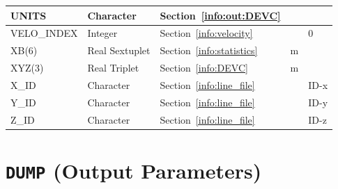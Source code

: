 \documentclass[11pt]{book}
\begin{document}
\begin{longtable}{@{\extracolsep{\fill}}|l|l|l|l|l|}
{\ct UNITS}                 & Character       & Section~\ref{info:out:DEVC}                                     &       &               \\ \hline
{\ct VELO\_INDEX}           & Integer         & Section~\ref{info:velocity}                                     &       &  0            \\ \hline
{\ct XB(6)}                 & Real Sextuplet  & Section~\ref{info:statistics}                                   & m     &               \\ \hline
{\ct XYZ(3)}                & Real Triplet    & Section~\ref{info:DEVC}                                         & m     &               \\ \hline
{\ct X\_ID}                 & Character       & Section~\ref{info:line_file}                                    &       &  {\ct ID-x}   \\ \hline
{\ct Y\_ID}                 & Character       & Section~\ref{info:line_file}                                    &       &  {\ct ID-y}   \\ \hline
{\ct Z\_ID}                 & Character       & Section~\ref{info:line_file}                                    &       &  {\ct ID-z}   \\ \hline
\end{longtable}


\vspace{\baselineskip}



\section{\texorpdfstring{{\tt DUMP}}{DUMP} (Output Parameters)}
\end{document}
